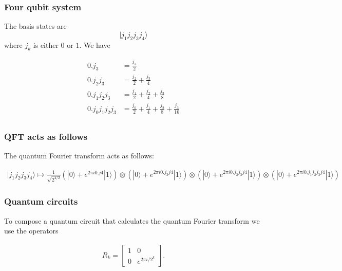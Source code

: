 \documentclass{beamer}
\begin{document}
\begin{frame}
\frametitle{Four qubit system}

The basis states are
\[
|j_1j_2j_3j_4 \rangle
\]
where \(j_k\) is either \(0\) or \(1\). We have

\begin{align*}
0.j_3 &= \frac{j_3}{2} \\
0.j_2j_3 &= \frac{j_2}{2} + \frac{j_3}{4} \\
0.j_1j_2j_3 &= \frac{j_1}{2} + \frac{j_2}{4} + \frac{j_3}{8} \\
0.j_0j_1j_2j_3 &= \frac{j_0}{2} + \frac{j_1}{4} + \frac{j_2}{8} + \frac{j_3}{16} \\
\end{align*}
\end{frame}

\begin{frame}
\frametitle{QFT acts as follows}

The quantum Fourier transform acts as follows:

\begin{align*}
|j_1j_2j_3j_4 \rangle \mapsto \frac{1}{\sqrt{2^{4/2}}}
\left(|0\rangle + e^{2 \pi i 0.j4}|1\rangle \right) \otimes 
\left(|0\rangle + e^{2 \pi i 0.j_3j4}|1\rangle \right) \otimes 
\left(|0\rangle + e^{2 \pi i 0.j_2j_3j4}|1\rangle \right) \otimes 
\left(|0\rangle + e^{2 \pi i 0.j_1j_2j_3j4}|1\rangle \right) 
\end{align*}
\end{frame}

\begin{frame}
\frametitle{Quantum circuits}

To compose a quantum circuit that calculates the quantum Fourier
transform we use the operators

\begin{align*}
R_k = 
\begin{bmatrix}
1 & 0 \\
0 & e^{2\pi i/2^k}
\end{bmatrix}.
\end{align*}
\end{frame}
\end{document}

